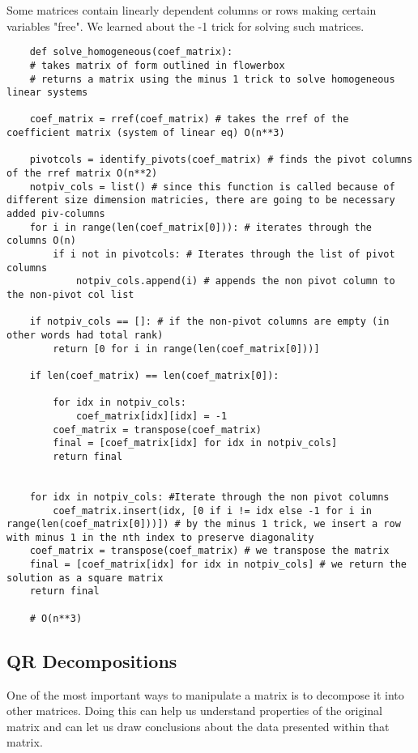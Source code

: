 \documentclass[12pt, a4paper]{article}
\begin{document}
Some matrices contain linearly dependent columns or rows making certain variables "free". We learned about the -1 trick for solving such matrices.
\begin{lstlisting}
    def solve_homogeneous(coef_matrix):
    # takes matrix of form outlined in flowerbox
    # returns a matrix using the minus 1 trick to solve homogeneous linear systems

    coef_matrix = rref(coef_matrix) # takes the rref of the coefficient matrix (system of linear eq) O(n**3)

    pivotcols = identify_pivots(coef_matrix) # finds the pivot columns of the rref matrix O(n**2)
    notpiv_cols = list() # since this function is called because of different size dimension matricies, there are going to be necessary added piv-columns
    for i in range(len(coef_matrix[0])): # iterates through the columns O(n)
        if i not in pivotcols: # Iterates through the list of pivot columns
            notpiv_cols.append(i) # appends the non pivot column to the non-pivot col list
    
    if notpiv_cols == []: # if the non-pivot columns are empty (in other words had total rank)
        return [0 for i in range(len(coef_matrix[0]))]

    if len(coef_matrix) == len(coef_matrix[0]):

        for idx in notpiv_cols:
            coef_matrix[idx][idx] = -1
        coef_matrix = transpose(coef_matrix)
        final = [coef_matrix[idx] for idx in notpiv_cols]
        return final


    for idx in notpiv_cols: #Iterate through the non pivot columns
        coef_matrix.insert(idx, [0 if i != idx else -1 for i in range(len(coef_matrix[0]))]) # by the minus 1 trick, we insert a row with minus 1 in the nth index to preserve diagonality
    coef_matrix = transpose(coef_matrix) # we transpose the matrix
    final = [coef_matrix[idx] for idx in notpiv_cols] # we return the solution as a square matrix  
    return final

    # O(n**3)
\end{lstlisting}

\subsection{QR Decompositions}

One of the most important ways to manipulate a matrix is to decompose it into other matrices. Doing this can help us understand 
properties of the original matrix and can let us draw conclusions about the data presented within that matrix. 
\end{document}
